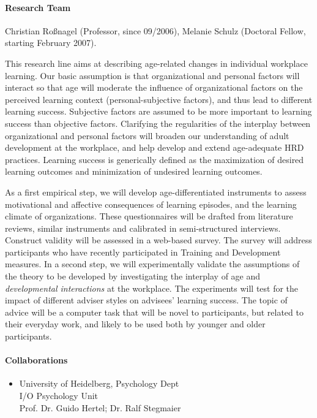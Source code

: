 

\paragraph{Research Team}
Christian Ro\ss nagel (Professor, since 09/2006), Melanie Schulz (Doctoral Fellow, starting February 2007).

\enlargethispage{0.5cm}
 This research line aims at describing age-related changes in individual workplace learning. Our basic assumption is that organizational and personal factors will interact so that age will moderate the influence of organizational factors on the perceived learning context (personal-subjective factors), and thus lead to different learning success. Subjective factors are assumed to be more important to learning success than objective factors. Clarifying the regularities of the interplay between organizational and personal factors will broaden our understanding of adult development at the workplace, and help develop and extend age-adequate HRD practices. Learning success is generically defined as the maximization of desired learning outcomes and minimization of undesired learning outcomes.

 As a first empirical step, we will develop age-differentiated instruments to assess motivational and affective consequences of learning episodes, and the learning climate of organizations. These questionnaires will be drafted from literature reviews, similar instruments and calibrated in semi-structured interviews. Construct validity will be assessed in a web-based survey. The survey will address participants who have recently participated in Training and Development measures. In a second step, we will experimentally validate the assumptions of the theory to be developed by investigating the interplay of age and \textit{developmental interactions} at the workplace. The experiments will test for the impact of different adviser styles on advisees' learning success. The topic of advice will be a computer task that will be novel to participants, but related to their everyday work, and likely to be used both by younger and older participants.

\paragraph{Collaborations}
\begin{itemize}
\item University of Heidelberg, Psychology Dept \\ I/O Psychology Unit \\ Prof. Dr. Guido Hertel; Dr. Ralf Stegmaier
\end{itemize}

